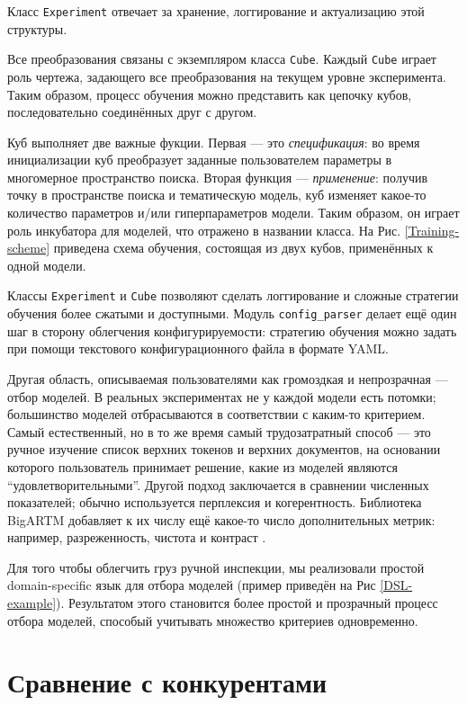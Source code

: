 Класс \texttt{Experiment} отвечает за хранение, логгирование и актуализацию этой структуры. 

Все преобразования связаны с экземпляром класса \texttt{Cube}. Каждый \texttt{Cube} играет роль чертежа, задающего все преобразования на текущем уровне эксперимента. Таким образом, процесс обучения можно представить как цепочку кубов, последовательно соединённых друг с другом.

Куб выполняет две важные фукции. Первая --- это \textit{спецификация}: во время инициализации куб преобразует заданные пользователем параметры в многомерное пространство поиска. Вторая функция --- \textit{применение}: получив точку в пространстве поиска и тематическую модель, куб изменяет какое-то количество параметров и/или гиперпараметров модели. Таким образом, он играет роль инкубатора для моделей, что отражено в названии класса. На Рис.  \ref{Training-scheme} приведена схема обучения, состоящая из двух кубов, применённых к одной модели.

Классы \texttt{Experiment} и \texttt{Cube} позволяют сделать логгирование и сложные стратегии обучения более сжатыми и доступными. Модуль \texttt{config\_parser} делает ещё один шаг в сторону облегчения конфигурируемости: стратегию обучения можно задать при помощи текстового конфигурационного файла в формате YAML.

Другая область, описываемая пользователями как громоздкая и непрозрачная --- отбор моделей. В реальных экспериментах не у каждой модели есть потомки; большинство моделей отбрасываются в соответствии с каким-то критерием. Самый естественный, но в то же время самый трудозатратный способ --- это ручное изучение список верхних токенов и верхних документов, на основании которого пользователь принимает решение, какие из моделей являются ``удовлетворительными''. Другой подход заключается в сравнении численных показателей; обычно используется перплексия и когерентность. Библиотека \mbox{BigARTM} добавляет к их числу ещё какое-то число дополнительных метрик: например, разреженность, чистота и контраст \cite{voron15mlj}.

Для того чтобы облегчить груз ручной инспекции, мы реализовали простой domain-specific язык для отбора моделей (пример приведён на Рис \ref{DSL-example}). Результатом этого становится более простой и прозрачный процесс отбора моделей, способый учитывать множество критериев одновременно.

\section{Сравнение с конкурентами}

